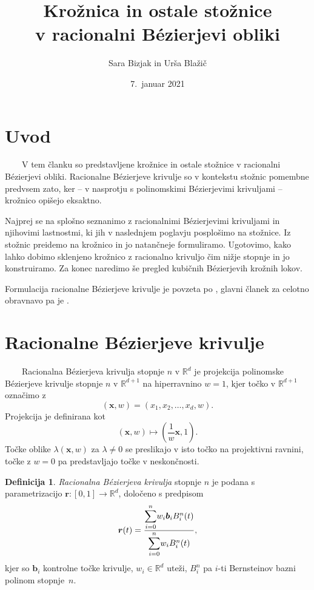 \documentclass[a4paper,11pt]{article}
\title{Krožnica in ostale stožnice \\
v racionalni B\'ezierjevi obliki
}
\author{Sara Bizjak in Urša Blažič}
\date{7.~januar 2021}
\theoremstyle{definition}
\newtheorem*{definicija}{Definicija}
\theoremstyle{plain}
\begin{document}
\maketitle

\section{Uvod}
\ \ \ \
V tem članku so predstavljene krožnice in ostale stožnice v racionalni B\'ezierjevi obliki. 
Racionalne B\'ezierjeve krivulje so v kontekstu stožnic pomembne predvsem zato, ker -- v nasprotju s polinomskimi B\'ezierjevimi krivuljami -- krožnico opišejo eksaktno. 

Najprej se na splošno seznanimo z racionalnimi B\'ezierjevimi krivuljami in njihovimi lastnostmi, ki jih v naslednjem poglavju posplošimo na stožnice. Iz stožnic preidemo na krožnico in jo natančneje formuliramo. 
Ugotovimo, kako lahko dobimo sklenjeno krožnico z racionalno krivuljo čim nižje stopnje in jo konstruiramo.
Za konec naredimo še pregled kubičnih B\'ezierjevih krožnih lokov.

Formulacija racionalne B\'ezierjeve krivulje je povzeta po \cite{knez}, glavni članek za celotno obravnavo pa je \cite{chou}.


\section{Racionalne B\'ezierjeve krivulje}
\ \ \ \
Racionalna B\'ezierjeva krivulja stopnje $n$ v $\mathbb{R}^d$ je projekcija polinomske B\'ezierjeve krivulje stopnje $n$ v $\mathbb{R}^{d+1}$ na hiperravnino $w=1$, kjer točko v  $\mathbb{R}^{d+1}$  označimo z
$$(\boldsymbol{x},w)=(x_1,x_2,\dots,x_d,w).$$
Projekcija je definirana kot
$$(\boldsymbol{x},w)\mapsto (\frac{1}{w}\boldsymbol{x},1).$$
Točke oblike $\lambda(\boldsymbol{x}, w)$ za $\lambda\neq 0$ se preslikajo v isto točko na projektivni ravnini, točke z
$w = 0$ pa predstavljajo točke v neskončnosti.

\begin{definicija}
\emph{Racionalna B\'ezierjeva krivulja} stopnje $n$ je podana s parametrizacijo $\boldsymbol{r}:[0,1]\rightarrow \mathbb{R}^d$, določeno s predpisom
$$\boldsymbol{r}(t)=\frac{\mathlarger{\sum}_{i=0}^n w_i\boldsymbol{b}_iB_i^n(t)}{\mathlarger{\sum}_{i=0}^n w_iB_i^n(t)},$$
kjer so $\boldsymbol{b}_i$ kontrolne točke krivulje, $w_i\in\mathbb{R}^d$ uteži, $B_i^n$ pa $i$-ti Bernsteinov bazni polinom stopnje~$n$.
\end{definicija}
 
\end{document}
